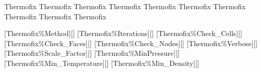
\FINALFIX{\newpage}
\begin{nmldescitem}
Thermofix%
Thermofix%
Thermofix%
Thermofix%
Thermofix%
Thermofix%
Thermofix%
Thermofix%
Thermofix%
Thermofix%
\end{nmldescitem}
[Thermofix\%Method][]
[Thermofix\%Iterations][]
[Thermofix\%Check\_Cells][]
[Thermofix\%Check\_Faces][]
[Thermofix\%Check\_Nodes][]
[Thermofix\%Verbose][]
[Thermofix\%Scale\_Factor][]
[Thermofix\%MinPressure][]
[Thermofix\%Min\_Temperature][]
[Thermofix\%Min\_Density][]

